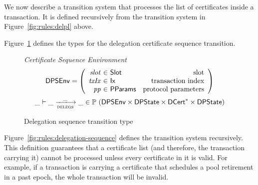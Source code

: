 We now describe a transition system that processes the list of certificates inside a transaction.
It is defined recursively from the transition system in Figure~\ref{fig:rules:delpl} above.

Figure~\ref{fig:type:delegations} defines the types for the delegation certificate sequence
transition.

\begin{figure}[hbt]
  \emph{Certificate Sequence Environment}
  \begin{equation*}
    \DPSEnv =
    \left(
      \begin{array}{r@{~\in~}lr}
        \var{slot} & \Slot & \text{slot}\\
        \var{txIx} & \Ix & \text{transaction index}\\
        \var{pp} & \PParams & \text{protocol parameters}\\
      \end{array}
    \right)
  \end{equation*}
  \begin{equation*}
    \_ \vdash \_ \trans{delegs}{\_} \_ \in
    \powerset (
    \DPSEnv \times \DPState \times \seqof{\DCert} \times \DPState)
  \end{equation*}
  \caption{Delegation sequence transition type}
  \label{fig:type:delegations}
\end{figure}

Figure~\ref{fig:rules:delegation-sequence} defines the transition system recursively.
This definition guarantees that a certificate list (and therefore, the transaction carrying it)
cannot be processed unless every certificate in it is valid. For example, if a transaction is
carrying a certificate that schedules a pool retirement in a past epoch, the whole transaction
will be invalid.


